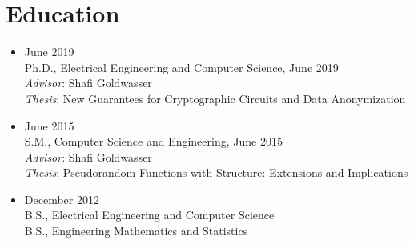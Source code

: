 
\newcommand{\cveducation}[6]%
  {\item \fSchool{#1} \hfill #3 \\ {#2, #6}, #3  \\ \textit{Advisor}: #5 \\ \textit{Thesis}: {#4}}
\newcommand{\cvBachelor}[4]{\item \fSchool{#1} \hfill #4 \\ {#2} \\ {#3}}




\section{Education}

\begin{itemize}[label={}]
\cveducation%
{\MIT}%
{Ph.D.}%
{June 2019}%
{New Guarantees for Cryptographic Circuits and Data Anonymization}%
{Shafi Goldwasser}%
{Electrical Engineering and Computer Science}%

\cveducation%
{\MIT}%
{S.M.}%
{June 2015}%
{Pseudorandom Functions with Structure: Extensions and Implications}%
{Shafi Goldwasser}%
{Computer Science and Engineering}%

\cvBachelor%
{\Berkeley}%
{B.S., Electrical Engineering and Computer Science}%
{B.S., Engineering Mathematics and Statistics}%
{December 2012}



\end{itemize}
